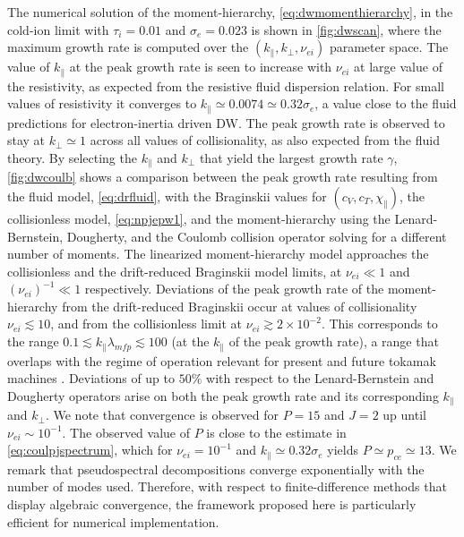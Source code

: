 The numerical solution of the moment-hierarchy, \cref{eq:dwmomenthierarchy}, in the cold-ion limit with $\tau_i=0.01$ and $\sigma_e=0.023$ is shown in \cref{fig:dwscan}, where the maximum growth rate is computed over the $(k_\parallel, k_\perp, \nu_{ei})$ parameter space.
%
The value of $k_\parallel$ at the peak growth rate is seen to increase with $\nu_{ei}$ at large value of the resistivity, as expected from the resistive fluid dispersion relation.
%
For small values of resistivity it converges to $k_\parallel \simeq 0.0074 \simeq 0.32 \sigma_e$, a value close to the fluid predictions for electron-inertia driven DW.
%
The peak growth rate is observed to stay at $k_\perp \simeq 1$ across all values of collisionality, as also expected from the fluid theory.
%
By selecting the $k_\parallel$ and $k_\perp$ that yield the largest growth rate $\gamma$, \cref{fig:dwcoulb} shows a comparison between the peak growth rate resulting from the fluid model, \cref{eq:drfluid}, with the Braginskii values for  $(c_{V},c_{T},\chi_{\parallel})$, the collisionless model, \cref{eq:npjepw1}, and the moment-hierarchy using the Lenard-Bernstein, Dougherty, and the Coulomb collision operator solving for a different number of moments.
%
The linearized moment-hierarchy model approaches the collisionless and the drift-reduced Braginskii model limits, at $\nu_{ei} \ll 1$ and $(\nu_{ei})^{-1} \ll 1$ respectively.
%
Deviations of the peak growth rate of the moment-hierarchy from the drift-reduced Braginskii occur at values of collisionality $\nu_{ei} \lesssim 10$, and from the collisionless limit at $\nu_{ei} \gtrsim 2\times 10^{-2}$.
%
This corresponds to the range $0.1 \lesssim k_\parallel \lambda_{mfp} \lesssim 100$ (at the $k_\parallel$ of the peak growth rate), a range that overlaps with the regime of operation relevant for present and future tokamak machines \citep{Pitts2011}.
%
Deviations of up to $50\%$ with respect to the Lenard-Bernstein and Dougherty operators arise on both the peak growth rate and its corresponding $k_\parallel$ and $k_\perp$.
%
We note that convergence is observed for $P = 15$ and $J=2$ up until $\nu_{ei} \sim 10^{-1}$.
%
The observed value of $P$ is close to the estimate in \cref{eq:coulpjspectrum}, which for $\nu_{ei} = 10^{-1}$ and $k_\parallel \simeq 0.32 \sigma_e$ yields $P \simeq p_{ce} \simeq 13$.
%
We remark that pseudospectral decompositions converge exponentially with the number of modes used.
%
Therefore, with respect to finite-difference methods that display algebraic convergence, the framework proposed here is particularly efficient for numerical implementation.

